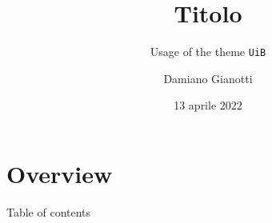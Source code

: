 \documentclass[UKenglish]{beamer}
\author[N. Cognome]{Damiano Gianotti}
\title{Titolo}
\subtitle{Usage of the theme \texttt{UiB}}
\date{13 aprile 2022}
\begin{document}
\section{Overview}
\begin{frame}{Table of contents}
    \tableofcontents[currentsection]
\end{frame}




\end{document}
